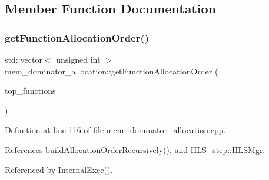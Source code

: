 \subsection{Member Function Documentation}
\mbox{\label{classmem__dominator__allocation_a5cc28dbe6aa36df89b08e2673c636a64}} 
\subsubsection{\texorpdfstring{get\+Function\+Allocation\+Order()}{getFunctionAllocationOrder()}}
{\footnotesize\ttfamily std\+::vector$<$ unsigned int $>$ mem\+\_\+dominator\+\_\+allocation\+::get\+Function\+Allocation\+Order (\begin{DoxyParamCaption}\item[{\hyperlink{classCustomOrderedSet}{Custom\+Ordered\+Set}$<$ unsigned int $>$}]{top\+\_\+functions }\end{DoxyParamCaption})\hspace{0.3cm}{\ttfamily [protected]}}



Definition at line 116 of file mem\+\_\+dominator\+\_\+allocation.\+cpp.



References build\+Allocation\+Order\+Recursively(), and H\+L\+S\+\_\+step\+::\+H\+L\+S\+Mgr.



Referenced by Internal\+Exec().

